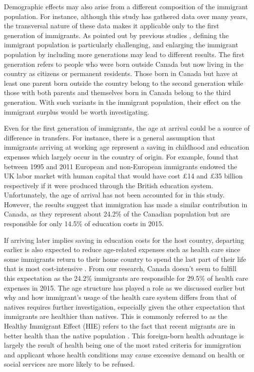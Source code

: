 \vspace{0.7em}\par
Demographic effects may also arise from a different composition of the immigrant population.
For instance, although this study has gathered data over many years, the transversal nature of these data makes it applicable only to the first generation of immigrants.
As pointed out by previous studies \citep{Lee:1998fs}, defining the immigrant population is particularly challenging, and enlarging the immigrant population by including more generations may lead to different results.
The first generation refers to people who were born outside Canada but now living in the country as citizens or permanent residents.
Those born in Canada but have at least one parent born outside the country belong to the second generation while those with both parents and themselves born in Canada belong to the third generation.
With such variants in the immigrant population, their effect on the immigrant surplus would be worth investigating.

\vspace{0.7em}\par
Even for the first generation of immigrants, the age at arrival could be a source of difference in transfers.
For instance, there is a general assumption that immigrants arriving at working age represent a saving in childhood and education expenses which largely occur in the country of origin.
For example, \citet{Dustmann:2014dr} found that between 1995 and 2011 European and non-European immigrants endowed the UK labor market with human capital that would have cost \pounds14 and \pounds35 billion respectively if it were produced through the British education system.
Unfortunately, the age of arrival has not been accounted for in this study.
However, the results suggest that immigration has made a similar contribution in Canada, as they represent about 24.2\% of the Canadian population but are responsible for only 14.5\% of education costs in 2015.


\vspace{0.7em}\par
If arriving later implies saving in education costs for the host country, departing earlier is also expected to reduce age-related expenses such as health care since some immigrants return to their home country to spend the last part of their life that is most cost-intensive \citep{Bratsberg:2014cl}.
From our research, Canada doesn't seem to fulfill this expectation as the 24.2\% immigrants are responsible for 29.5\% of health care expenses in 2015.
The age structure has played a role as we discussed earlier but why and how immigrant's usage of the health care system differs from that of natives requires further investigation, especially given the other expectation that immigrants are healthier than natives.
This is commonly referred to as the Healthy Immigrant Effect (HIE) refers to the fact that recent migrants are in better health than the native population \citep{Ichou:2019ik,Vang:2016di}.
This foreign-born health advantage is largely the result of health being one of the most rated criteria for immigration and applicant whose health conditions may cause excessive demand on health or social services are more likely to be refused.

